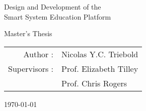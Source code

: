 \newpage%
\clearpage%

\begin{titlepage}%



\begin{center}

%




\vspace*{5cm}%
{\Huge Design and Development of the\\ Smart System Education Platform\par}%

\vspace{2.5cm}%
{\LARGE Master's Thesis}
\vspace{2.5cm}%
        
{\large\begin{tabular}{rl}
    Author : & Nicolas Y.C. Triebold \\
    Supervisors :   & Prof. Elizabeth Tilley \\
                    & Prof. Chris Rogers \\
    \end{tabular}}%
\vfill%
\today%
\end{center}%
\end{titlepage}%